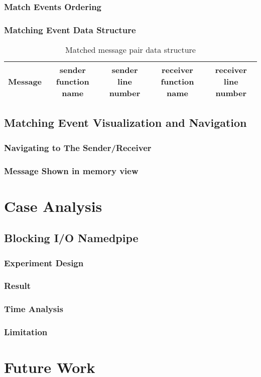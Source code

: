 \documentclass[paper=a4, fontsize=11pt]{scrartcl}
\numberwithin{equation}{section}		%
\numberwithin{figure}{section}			%
\numberwithin{table}{section}				%
\begin{document}
\subsubsection{Match Events Ordering}
\subsubsection{Matching Event Data Structure}
\begin{table}[h]
 \begin{center}
  \caption{Matched message pair data structure}
\label{table2}
\begin{tabular}{|c|c|c|c|c|}
      \hline
         Message& sender function name & sender line number  & receiver function name & receiver line number \\
       \hline
\end{tabular}
\end{center}
\end{table}
\subsection{Matching Event Visualization and Navigation}
\subsubsection{Navigating to The Sender/Receiver}
\subsubsection{Message Shown in memory view}



\section{Case Analysis}
\subsection{Blocking I/O Namedpipe}
\subsubsection{Experiment Design}
\subsubsection{Result}
\subsubsection{Time Analysis}
\subsubsection{Limitation}

\section{Future Work}



 


\end{document}
